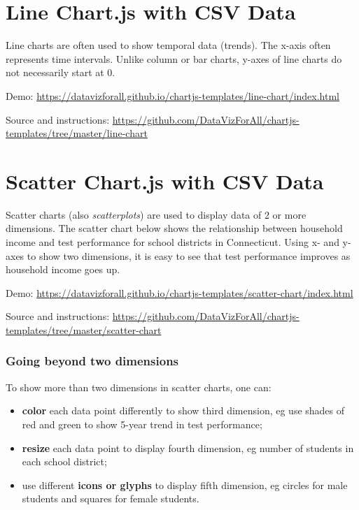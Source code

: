 \documentclass[
  english,
]{book}
\providecommand{\tightlist}{%
  \setlength{\itemsep}{0pt}\setlength{\parskip}{0pt}}
\begin{document}
\hypertarget{chartjs-line}{%
\section{Line Chart.js with CSV Data}\label{chartjs-line}}

Line charts are often used to show temporal data (trends). The x-axis often represents time intervals. Unlike column or bar charts, y-axes of line charts do not necessarily start at 0.

Demo: \url{https://datavizforall.github.io/chartjs-templates/line-chart/index.html}

Source and instructions: \url{https://github.com/DataVizForAll/chartjs-templates/tree/master/line-chart}

\hypertarget{chartjs-scatter}{%
\section{Scatter Chart.js with CSV Data}\label{chartjs-scatter}}

Scatter charts (also \emph{scatterplots}) are used to display data of 2 or more dimensions. The scatter chart below shows the relationship between household income and test performance for school districts in Connecticut. Using x- and y-axes to show two dimensions, it is easy to see that test performance improves as household income goes up.

Demo: \url{https://datavizforall.github.io/chartjs-templates/scatter-chart/index.html}

Source and instructions: \url{https://github.com/DataVizForAll/chartjs-templates/tree/master/scatter-chart}

\hypertarget{going-beyond-two-dimensions}{%
\subsubsection{Going beyond two dimensions}\label{going-beyond-two-dimensions}}

To show more than two dimensions in scatter charts, one can:

\begin{itemize}
\tightlist
\item
  \textbf{color} each data point differently to show third dimension, eg use shades of red and green to show 5-year trend in test performance;
\item
  \textbf{resize} each data point to display fourth dimension, eg number of students in each school district;
\item
  use different \textbf{icons or glyphs} to display fifth dimension, eg circles for male students and squares for female students.
\end{itemize}
\end{document}
